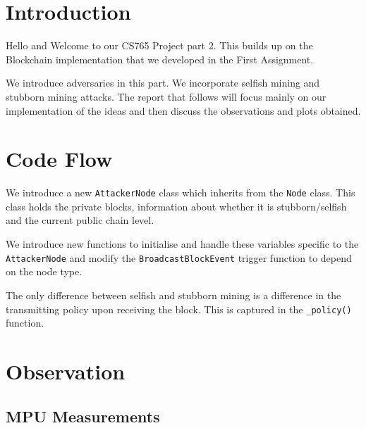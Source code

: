 \documentclass[a4paper,14pt]{article}
\begin{document}

\date{Spring 2023}
\maketitle

\justifying


\justifying

\section*{Introduction}

Hello and Welcome to our CS765 Project part 2. This builds up on the Blockchain implementation that we developed in the First Assignment.

We introduce adversaries in this part. We incorporate selfish mining and stubborn mining attacks. The report that follows will focus mainly on our implementation of the ideas and then discuss the observations and plots obtained.

\section{Code Flow}

We introduce a new \verb|AttackerNode| class which inherits from the \verb|Node| class. This class holds the private blocks, information about whether it is stubborn/selfish and the current public chain level.

We introduce new functions to initialise and handle these variables specific to the \verb|AttackerNode| and modify the \verb|BroadcastBlockEvent| trigger function to depend on the node type.

The only difference between selfish and stubborn mining is a difference in the transmitting policy upon receiving the block. This is captured in the \verb|_policy()| function.

\section{Observation}

\subsection{MPU Measurements}
\end{document}
